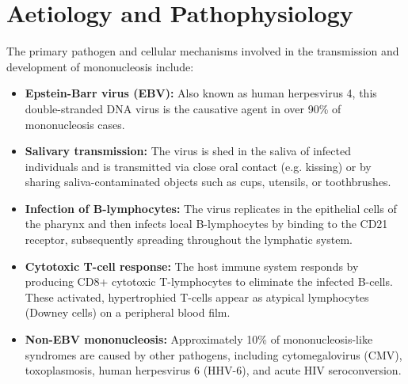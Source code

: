 \section*{Aetiology and Pathophysiology}
The primary pathogen and cellular mechanisms involved in the transmission and development of mononucleosis include:
\begin{itemize}
    \item \textbf{Epstein-Barr virus (EBV):} Also known as human herpesvirus 4, this double-stranded DNA virus is the causative agent in over 90\% of mononucleosis cases.
    \item \textbf{Salivary transmission:} The virus is shed in the saliva of infected individuals and is transmitted via close oral contact (e.g. kissing) or by sharing saliva-contaminated objects such as cups, utensils, or toothbrushes.
    \item \textbf{Infection of B-lymphocytes:} The virus replicates in the epithelial cells of the pharynx and then infects local B-lymphocytes by binding to the CD21 receptor, subsequently spreading throughout the lymphatic system.
    \item \textbf{Cytotoxic T-cell response:} The host immune system responds by producing CD8+ cytotoxic T-lymphocytes to eliminate the infected B-cells. These activated, hypertrophied T-cells appear as atypical lymphocytes (Downey cells) on a peripheral blood film.
    \item \textbf{Non-EBV mononucleosis:} Approximately 10\% of mononucleosis-like syndromes are caused by other pathogens, including cytomegalovirus (CMV), toxoplasmosis, human herpesvirus 6 (HHV-6), and acute HIV seroconversion.
\end{itemize}

